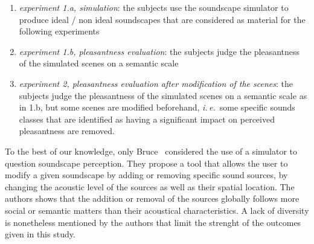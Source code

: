 \documentclass[preprint,12pt]{elsarticle}
\newcommand{\ie}{\emph{i.\,e.}}
\newcommand{\al}{\emph{et~al.}}
\begin{document}
\begin{enumerate}
\item \emph{experiment 1.a, simulation}:  the subjects use the soundscape simulator to produce ideal / non ideal soundscapes that are considered as material for the following experiments
\item \emph{experiment 1.b, pleasantness evaluation}: the subjects judge the pleasantness of the simulated scenes on a semantic scale
\item \emph{experiment 2, pleasantness evaluation after modification of the scenes}: the subjects judge the pleasantness of the simulated scenes on a semantic scale as in 1.b, but some scenes are modified beforehand, \ie~some specific sounds classes that are identified as having a significant impact on perceived pleasantness are removed.
\end{enumerate}


To the best of our knowledge, only Bruce~\cite{bruce2009development,bruce2014effects} considered the use of a simulator to question soundscape perception. They propose a tool that allows the user to modify a given soundscape by adding or removing specific sound sources, by changing the acoustic level of the sources as well as their spatial location. The authors shows that the addition or removal of the sources globally follows more social or semantic matters than their acoustical characteristics. A lack of diversity is nonetheless mentioned by the authors that limit the strenght of the outcomes given in this study.

\end{document}
